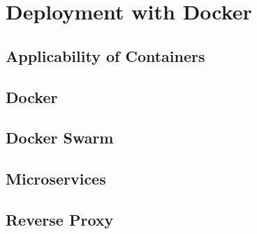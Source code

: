 \chapter[Deployment]{Deployment with Docker} \label{ch:deployment}

\section{Applicability of Containers}

\section{Docker}

\section{Docker Swarm}

\section{Microservices}

\section{Reverse Proxy}